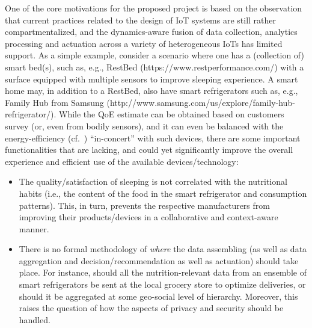 One of the core motivations for the proposed project is based on the observation that current practices related to the design of IoT systems are still rather compartmentalized, and the dynamics-aware fusion of data collection, analytics processing and actuation across a variety of heterogeneous IoTs has limited support. As a simple example, consider a scenario where one has a (collection of) smart bed(s), such as, e.g., RestBed (https://www.restperformance.com/) with a surface equipped with multiple sensors to improve sleeping experience. A smart home may, in addition to a RestBed, also have smart refrigerators such as, e.g., Family Hub from Samsung (http://www.samsung.com/us/explore/family-hub-refrigerator/). While the QoE estimate can be obtained based on customers survey (or, even from bodily sensors), and it can even be balanced with the energy-efficiency (cf.~\cite{FlorisMPA15}) ``in-concert'' with such devices, there are some important functionalities that are lacking, and could yet significantly improve the overall experience and efficient use of the available devices/technology:

\begin{itemize}
\item The quality/satisfaction of sleeping is not correlated with the nutritional habits (i.e., the content of the food in the smart refrigerator and consumption patterns). This, in turn, prevents the respective manufacturers from improving their products/devices in a collaborative and context-aware manner.

\item There is no formal methodology of {\it where} the data assembling (as well as data aggregation and decision/recommendation as well as actuation) should take place. For instance, should all the nutrition-relevant data from an ensemble of smart refrigerators be sent at the local grocery store to optimize deliveries, or should it be aggregated at some geo-social level of hierarchy. Moreover, this raises the question of how the aspects of privacy and security should be handled.
\end{itemize}






